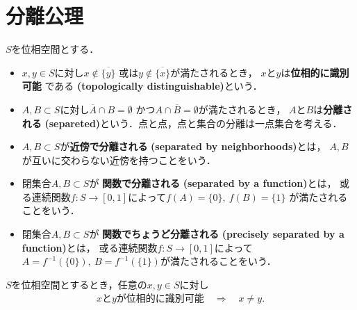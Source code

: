 \section{分離公理}
	\begin{screen}
		\begin{dfn}[位相的に識別可能・分離]
			$S$を位相空間とする．
			\begin{itemize}
				\item $x,y \in S$に対し$x \notin \overline{\{y\}}$
					或は$y \notin \overline{\{x\}}$が満たされるとき，
					$x$と$y$は{\bf 位相的に識別可能}
					である
					{\bf (topologically distinguishable)}という．
				\item $A,B \subset S$に対し$\overline{A} \cap B = \emptyset$
					かつ$A \cap \overline{B} = \emptyset$が満たされるとき，
					$A$と$B$は{\bf 分離される}
					{\bf (separeted)}という．点と点，点と集合の分離は一点集合を考える．
				\item $A,B \subset S$が{\bf 近傍で分離される}
					{\bf (separated by neighborhoods)}とは，
					$A,B$が互いに交わらない近傍を持つことをいう．
				\item 閉集合$A,B \subset S$が
					{\bf 関数で分離される}
					{\bf (separated by a function)}とは，
					或る連続関数$f:S \longrightarrow [0,1]$によって$f(A) = \{0\},\ f(B) = \{1\}$
					が満たされることをいう．
				\item 閉集合$A,B \subset S$が
					{\bf 関数でちょうど分離される}
					{\bf (precisely separated by a function)}とは，
					或る連続関数$f:S \longrightarrow [0,1]$によって
					$A = f^{-1}(\{0\}),\ B = f^{-1}(\{1\})$が満たされることをいう．
			\end{itemize}
		\end{dfn}
	\end{screen}
	
	\begin{screen}
		\begin{thm}[位相的に識別可能な二点は相異なる]
			$S$を位相空間とするとき，任意の$x,y \in S$に対し
			\begin{align}
				\mbox{$x$と$y$が位相的に識別可能} \quad \Longrightarrow \quad
				x \neq y .
			\end{align}
		\end{thm}
	\end{screen}
	

